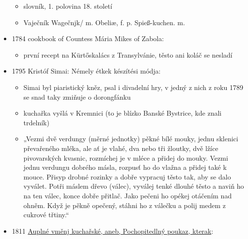 \begin{itemize}
  \begin{itemize}
  \tightlist
  \item
    slovník, 1. polovina 18. století
  \item
    Vaječník \textbar{} Wagečnjk/ m. Obeliæ, f. p. Spieß-kuchen. m.
  \end{itemize}
\item
  1784 cookbook of Countess Mária Mikes of Zabola:

  \begin{itemize}
  \tightlist
  \item
    první recept na Kürtőskalács z Transylvánie, těsto ani koláč se
    nesladí
  \end{itemize}
\item
  1795 Kristóf Simai: Némely étkek készítési módja:

  \begin{itemize}
  \tightlist
  \item
    Simai byl piaristický kněz, psal i divadelní hry, v jedný z nich z
    roku 1789 se snad taky zmiňuje o dorongfánku
  \item
    kuchařka vyšlá v Kremnici (to je blízko Banské Bystrice, kde znali
    trdelník)
  \item
    „Vezmi dvě verdungy (měrné jednotky) pěkné bílé mouky, jednu
    sklenici převařeného mléka, ale ať je vlahé, dva nebo tři žloutky,
    dvě lžíce pivovarských kvasnic, rozmíchej je v mléce a přidej do
    mouky. Vezmi jednu verdungu dobrého másla, rozpusť ho do vlažna a
    přidej také k mouce. Přisyp drobné rozinky a dobře vypracuj těsto
    tak, aby se dalo vyválet. Potři máslem dřevo (válec), vyválej tenké
    dlouhé těsto a naviň ho na ten válec, konce dobře přitlač. Jako
    pečeni ho opékej otáčením nad ohněm. Když je pěkně opečený, stáhni
    ho z válečku a polij medem z cukrové třtiny.``
  \end{itemize}
\item
  1811
  \href{https://ceskadigitalniknihovna.cz/view/uuid:e11769d0-4c42-11e7-aac4-005056827e51?page=uuid\%3A628a69f0-6565-11e7-94b3-005056825209&source=mzk}{Auplné
  vměnj kuchařské, aneb, Pochopitedlný poukaz, kterak}:


\end{itemize}
